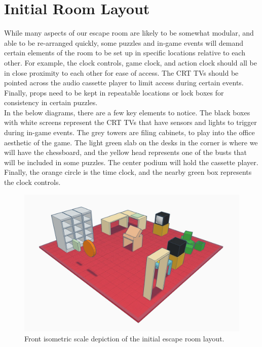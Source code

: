 \documentclass[conference]{IEEEtran}
\begin{document}
\section{Initial Room Layout}
While many aspects of our escape room are likely to be somewhat modular, and able to be re-arranged quickly,
some puzzles and in-game events will demand certain elements of the room to be set up in specific locations relative
to each other. For example, the clock controls, game clock, and action clock should all be in close proximity to each
other for ease of access. The CRT TVs should be pointed across the audio cassette player to limit
access during certain events. Finally, props need to be kept in repeatable
locations or lock boxes for consistency in certain puzzles.
\\
\indent In the below diagrams, there are a few key elements to notice. The black boxes with white screens
represent the CRT TVs that have sensors and lights to trigger during in-game events. The
grey towers are filing cabinets, to play into the office aesthetic of the game. The light green slab on the
desks in the corner is where we will have the chessboard, and the yellow head represents one of the busts
that will be included in some puzzles. The center podium will hold the cassette player. Finally, the orange circle
is the time clock, and the nearby green box represents the clock controls.

\begin{figure}[ht]
    \centering
    \includegraphics[width=0.90\columnwidth]{Images/EscapeRoomIsoFront.jpg}
    \caption{Front isometric scale depiction of the initial escape room layout.}
\end{figure}
\end{document}
